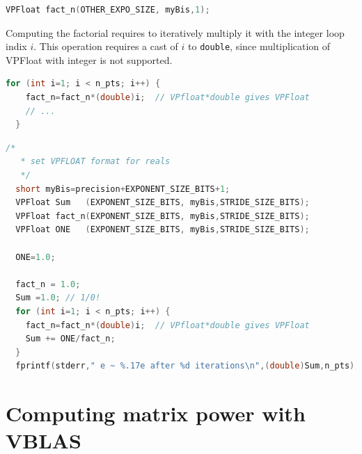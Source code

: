 \documentclass[11pt]{report}
\begin{document}
\begin{lstlisting}[language=C, caption = {VPFLoat example}]
  VPFloat fact_n(OTHER_EXPO_SIZE, myBis,1);
\end{lstlisting}

Computing the factorial requires to iteratively multiply it with the integer loop indix $i$. This operation requires a cast of $i$ to \texttt{double}, since multiplication of VPFloat with integer is not supported. 

\begin{lstlisting}[language=C, caption = {VPFLoat example}]
 for (int i=1; i < n_pts; i++) {
    fact_n=fact_n*(double)i;  // VPfloat*double gives VPFloat
    // ...
  }
\end{lstlisting}



\begin{lstlisting}[language=C, caption = {VPFLoat example}]
  /* 
   * set VPFLOAT format for reals
   */
  short myBis=precision+EXPONENT_SIZE_BITS+1;
  VPFloat Sum   (EXPONENT_SIZE_BITS, myBis,STRIDE_SIZE_BITS);
  VPFloat fact_n(EXPONENT_SIZE_BITS, myBis,STRIDE_SIZE_BITS);
  VPFloat ONE   (EXPONENT_SIZE_BITS, myBis,STRIDE_SIZE_BITS);

  ONE=1.0;
  
  fact_n = 1.0;
  Sum =1.0; // 1/0!
  for (int i=1; i < n_pts; i++) {
    fact_n=fact_n*(double)i;  // VPfloat*double gives VPFloat
    Sum += ONE/fact_n;
  }
  fprintf(stderr," e ~ %.17e after %d iterations\n",(double)Sum,n_pts);

\end{lstlisting}

\section{Computing matrix power  with VBLAS}





\end{document}
